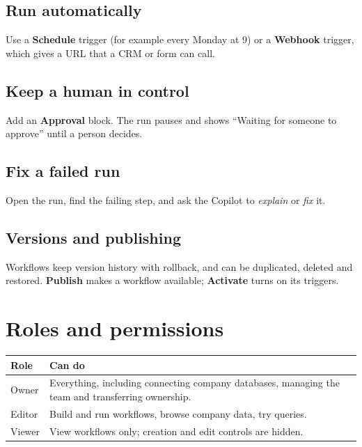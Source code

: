\documentclass[11pt,a4paper]{article}
\begin{document}
\subsection{Run automatically}
Use a \textbf{Schedule} trigger (for example every Monday at 9) or a \textbf{Webhook}
trigger, which gives a URL that a CRM or form can call.

\subsection{Keep a human in control}
Add an \textbf{Approval} block. The run pauses and shows ``Waiting for someone to
approve'' until a person decides.

\subsection{Fix a failed run}
Open the run, find the failing step, and ask the Copilot to \emph{explain} or
\emph{fix} it.

\subsection{Versions and publishing}
Workflows keep version history with rollback, and can be duplicated, deleted and
restored. \textbf{Publish} makes a workflow available; \textbf{Activate} turns on
its triggers.

\section{Roles and permissions}

\begin{longtable}{@{}L{2.6cm}L{13cm}@{}}
\toprule
\textbf{Role} & \textbf{Can do} \\
\midrule
\endhead
Owner & Everything, including connecting company databases, managing the team and transferring ownership. \\
Editor & Build and run workflows, browse company data, try queries. \\
Viewer & View workflows only; creation and edit controls are hidden. \\
\bottomrule
\end{longtable}
\end{document}
